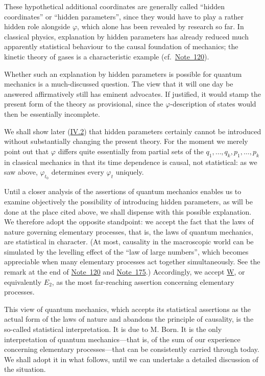\documentclass[fontsize=13pt,twoside,openany,headings=normal,parskip=false,bookmarkpackage=false,DIV=calc]{scrbook}
\begin{document}
These hypothetical additional coordinates are generally called ``hidden coordinates'' or ``hidden parameters'', since they would have to play a rather hidden role alongside $\varphi$, which alone has been revealed by research so far. In classical physics, explanation by hidden parameters has already reduced much apparently statistical behaviour to the causal foundation of mechanics; the kinetic theory of gases is a characteristic example (cf.\ \hyperlink{note-120}{Note~120}).

Whether such an explanation by hidden parameters is possible for quantum mechanics is a much-discussed question. The view that it will one day be answered affirmatively still has eminent advocates. If justified, it would stamp the present form of the theory as provisional, since the $\varphi$-description of states would then be essentially incomplete.

We shall show later (\hyperref[sec:IV.2]{IV.2}) that hidden parameters certainly cannot be introduced without substantially changing the present theory. For the moment we merely point out that $\varphi$ differs quite essentially from partial sets of the $q_1,\ldots,q_k,p_1,\ldots,p_k$ in classical mechanics in that its time dependence is causal, not statistical: as we saw above, $\varphi_{t_0}$ determines every $\varphi_t$ uniquely.

Until a closer analysis of the assertions of quantum mechanics enables us to examine objectively the possibility of introducing hidden parameters, as will be done at the place cited above, we shall dispense with this possible explanation. We therefore adopt the opposite standpoint: we accept the fact that the laws of nature governing elementary processes, that is, the laws of quantum mechanics, are statistical in character. (At most, causality in the macroscopic world can be simulated by the levelling effect of the ``law of large numbers'', which becomes appreciable when many elementary processes act together simultaneously. See the remark at the end of \hyperlink{note-120}{Note~120} and \hyperlink{note-175}{Note~175}.) Accordingly, we accept \hyperref[post:III.1.W]{W}, or equivalently \hyperref[post:III.1.E2]{$E_2$}, as the most far-reaching assertion concerning elementary processes.

This view of quantum mechanics, which accepts its statistical assertions as the actual form of the laws of nature and abandons the principle of causality, is the so-called statistical interpretation. It is due to M. Born. It is the only interpretation of quantum mechanics---that is, of the sum of our experience concerning elementary processes---that can be consistently carried through today. We shall adopt it in what follows, until we can undertake a detailed discussion of the situation.
\end{document}
